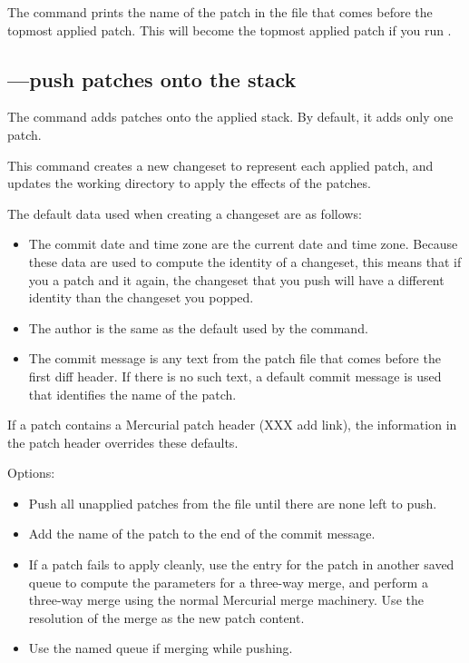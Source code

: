 The  command prints the name of the patch in the
 file that comes before the topmost applied patch.
This will become the topmost applied patch if you run .

\subsection{---push patches onto the stack}
\label{sec:mq:cmd:qpush}

The  command adds patches onto the applied stack.  By
default, it adds only one patch.

This command creates a new changeset to represent each applied patch,
and updates the working directory to apply the effects of the patches.

The default data used when creating a changeset are as follows:
\begin{itemize}
\item The commit date and time zone are the current date and time
  zone.  Because these data are used to compute the identity of a
  changeset, this means that if you  a patch and
   it again, the changeset that you push will have a
  different identity than the changeset you popped.
\item The author is the same as the default used by the 
  command.
\item The commit message is any text from the patch file that comes
  before the first diff header.  If there is no such text, a default
  commit message is used that identifies the name of the patch.
\end{itemize}
If a patch contains a Mercurial patch header (XXX add link), the
information in the patch header overrides these defaults.

Options:
\begin{itemize}
\item[\hgopt{qpush}{-a}] Push all unapplied patches from the
   file until there are none left to push.
\item[\hgopt{qpush}{-l}] Add the name of the patch to the end
  of the commit message.
\item[\hgopt{qpush}{-m}] If a patch fails to apply cleanly, use the
  entry for the patch in another saved queue to compute the parameters
  for a three-way merge, and perform a three-way merge using the
  normal Mercurial merge machinery.  Use the resolution of the merge
  as the new patch content.
\item[\hgopt{qpush}{-n}] Use the named queue if merging while pushing.
\end{itemize}

